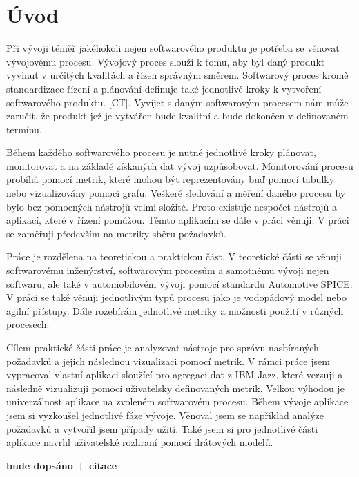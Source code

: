 \documentclass[czech,master,public,dept460,male,cpdeclaration,oneside]{diploma}
\begin{document}
\MakeTitlePages

 \lstlistoflistings
 
\section{Úvod}
\label{sec:Introduction}

Při vývoji téměř jakéhokoli nejen softwarového produktu je potřeba se věnovat vývojovému procesu. Vývojový proces slouží k tomu, aby byl daný produkt vyvinut v určitých kvalitách a řízen správným směrem. Softwarový proces kromě standardizace řízení a plánování definuje také jednotlivé kroky k vytvoření softwarového produktu. [CT]. Vyvíjet s daným softwarovým procesem nám může zaručit, že produkt jež je vytvářen bude kvalitní a bude dokončen v definovaném termínu. 

Během každého softwarového procesu je nutné jednotlivé kroky plánovat, monitorovat a na základě získaných dat vývoj uzpůsobovat. Monitorování procesu probíhá pomocí metrik, které mohou být reprezentovány buď pomocí tabulky nebo vizualizovány pomocí grafu. Veškeré sledování a měření daného procesu by bylo bez pomocných nástrojů velmi složité. Proto existuje nespočet nástrojů a aplikací, které v řízení pomůžou. Těmto aplikacím se dále v práci věnuji. V práci se zaměřuji především na metriky sběru požadavků.

Práce je rozdělena na teoretickou a praktickou část. V teoretické části se věnuji softwarovému inženýrství, softwarovým procesům a samotnému vývoji nejen softwaru, ale také v automobilovém vývoji pomocí standardu Automotive SPICE. V práci se také věnuji jednotlivým typů procesu jako je vodopádový model nebo agilní přístupy. Dále rozebírám jednotlivé metriky a možnosti použití v různých procesech.

Cílem praktické části práce je analyzovat nástroje pro správu nasbíraných požadavků a jejich následnou vizualizaci pomocí metrik. V rámci práce jsem vypracoval vlastní aplikaci sloužící pro agregaci dat z IBM Jazz, které verzuji a následně vizualizuji pomocí uživatelsky definovaných metrik. Velkou výhodou je univerzálnost aplikace na zvoleném softwarovém procesu. Během vývoje aplikace jsem si vyzkoušel jednotlivé fáze vývoje. Věnoval jsem se například analýze požadavků a vytvořil jsem případy užití. Také jsem si pro jednotlivé části aplikace navrhl uživatelské rozhraní pomocí drátových modelů.


\textbf{bude dopsáno + citace}
\end{document}
